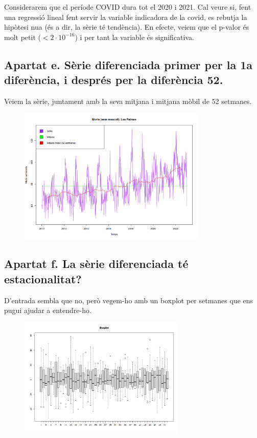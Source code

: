 \documentclass[a4paper, 11pt]{article}
\begin{document}
Considerarem que el període COVID dura tot el 2020 i 2021. Cal veure si, fent una regressió lineal fent servir la
variable indicadora de la covid, es rebutja la hipòtesi nu\lgem{}a (és a dir, la sèrie té tendència). En efecte, veiem
que el p-valor és molt petit ($< 2 \cdot 10^{-16}$) i per tant la variable és significativa.

\subsection*{Apartat e. Sèrie diferenciada primer per la 1a diferència, i després per la diferència 52.}

Veiem la sèrie, juntament amb la seva mitjana i mitjana mòbil de 52 setmanes.

\begin{figure}[H]
  \centering
  \includegraphics[width=9cm]{assets/serie.png}
\end{figure}

\subsection*{Apartat f. La sèrie diferenciada té estacionalitat?}

D'entrada sembla que no, però vegem-ho amb un boxplot per setmanes que ens pugui ajudar a entendre-ho.

\begin{figure}[H]
  \centering
  \includegraphics[width=8cm]{assets/boxplot-diff.png}
\end{figure}
\end{document}
